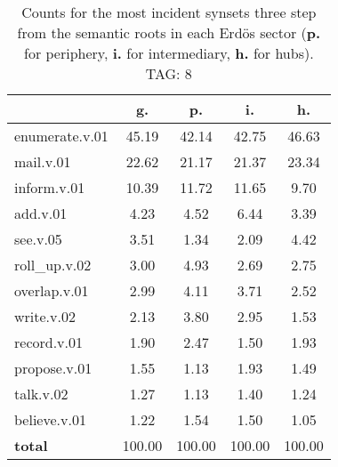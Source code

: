 \begin{table}[h!]
\begin{center}
\begin{tabular}{| l || c | c | c | c |}\hline
 & {\bf g.} & {\bf p.} & {\bf i.} & {\bf h.} \\\hline\hline
enumerate.v.01 & 45.19  & 42.14  & 42.75  & 46.63 \\\hline
mail.v.01 & 22.62  & 21.17  & 21.37  & 23.34 \\\hline
inform.v.01 & 10.39  & 11.72  & 11.65  & 9.70 \\\hline
add.v.01 & 4.23  & 4.52  & 6.44  & 3.39 \\\hline
see.v.05 & 3.51  & 1.34  & 2.09  & 4.42 \\\hline
roll\_up.v.02 & 3.00  & 4.93  & 2.69  & 2.75 \\\hline
overlap.v.01 & 2.99  & 4.11  & 3.71  & 2.52 \\\hline
write.v.02 & 2.13  & 3.80  & 2.95  & 1.53 \\\hline
record.v.01 & 1.90  & 2.47  & 1.50  & 1.93 \\\hline
propose.v.01 & 1.55  & 1.13  & 1.93  & 1.49 \\\hline
talk.v.02 & 1.27  & 1.13  & 1.40  & 1.24 \\\hline
believe.v.01 & 1.22  & 1.54  & 1.50  & 1.05 \\\hline\hline
{{\bf total}} & 100.00  & 100.00  & 100.00  & 100.00 \\\hline
\end{tabular}
\caption{Counts for the most incident synsets three step from the semantic roots in each Erd\"os sector ({\bf p.} for periphery, {\bf i.} for intermediary, {\bf h.} for hubs). TAG: 8}
\end{center}
\end{table}